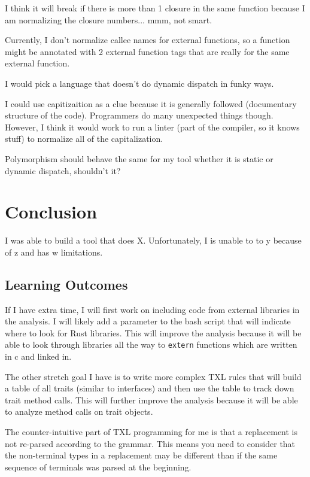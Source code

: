 \documentclass[11pt]{article}
\begin{document}
I think it will break if there is more than 1 closure in the same function because I am normalizing the closure numbers... mmm, not smart.

Currently, I don't normalize callee names for external functions, so a function might be annotated with 2 external function tags that are really for the same external function.

I would pick a language that doesn't do dynamic dispatch in funky ways.

I could use capitizaition as a clue because it is generally followed (documentary structure of the code).
Programmers do many unexpected things though.
However, I think it would work to run a linter (part of the compiler, so it knows stuff) to normalize all of the capitalization.

Polymorphism should behave the same for my tool whether it is static or dynamic dispatch, shouldn't it?

\section{Conclusion}
I was able to build a tool that does X.
Unfortunately, I is unable to to y because of z and has w limitations.

\subsection{Learning Outcomes}
If I have extra time, I will first work on including code from external libraries in the analysis.
I will likely add a parameter to the bash script that will indicate where to look for Rust libraries.
This will improve the analysis because it will be able to look through libraries all the way to \lstinline{extern} functions which are written in c and linked in.

The other stretch goal I have is to write more complex TXL rules that will build a table of all traits (similar to interfaces) and then use the table to track down trait method calls.
This will further improve the analysis because it will be able to analyze method calls on trait objects.

The counter-intuitive part of TXL programming for me is that a replacement is not re-parsed according to the grammar.
This means you need to consider that the non-terminal types in a replacement may be different than if the same sequence of terminals was parsed at the beginning.
\end{document}

